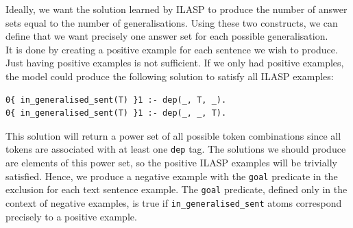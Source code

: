 Ideally, we want the solution learned by ILASP to produce the number of answer sets equal to the number of generalisations.
Using these two constructs, we can define that we want precisely one answer set for each possible generalisation. \\
It is done by creating a positive example for each sentence we wish to produce. 
Just having positive examples is not sufficient.
If we only had positive examples, the model could produce the following solution to satisfy all ILASP examples:
\begin{verbatim}
0{ in_generalised_sent(T) }1 :- dep(_, T, _).
0{ in_generalised_sent(T) }1 :- dep(_, _, T).
\end{verbatim}
This solution will return a power set of all possible token combinations since all tokens are associated with at least one \verb_dep_ tag. 
The solutions we should produce are elements of this power set, so the positive ILASP examples will be trivially satisfied.
Hence, we produce a negative example with the \verb_goal_ predicate in the exclusion for each text sentence example.
The \verb_goal_ predicate, defined only in the context of negative examples, is true if \verb+in_generalised_sent+ atoms correspond precisely to a positive example.


